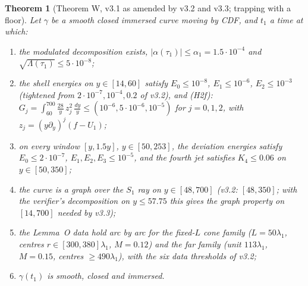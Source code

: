 \documentclass[11pt]{amsart}
\newtheorem{theorem}{Theorem}[section]
\theoremstyle{definition}
\theoremstyle{remark}
\newcommand{\Lam}{\Lambda}
\begin{document}
\begin{theorem}[Theorem W, v3.1 as amended by v3.2 and v3.3; trapping with a floor]\label{thm:W}
Let $\gamma$ be a smooth closed immersed curve moving by CDF, and $t_1$ a time at which:
\begin{enumerate}[label=\textup{(H\arabic*)},leftmargin=*,itemsep=1pt]
\item the modulated decomposition exists, $|\alpha(\tau_1)|\le\alpha_1=1.5\cdot10^{-4}$ and $\sqrt{\Lam(\tau_1)}\le5\cdot10^{-8}$;
\item the shell energies on $y\in[14,60]$ satisfy $E_0\le10^{-8}$, $E_1\le10^{-6}$, $E_2\le10^{-3}$ (tightened from $2\cdot10^{-7},10^{-4},0.2$ of v3.2), and \textup{(H2f)}: $G_j=\int_{60}^{700}\frac{28}y\,z_j^2\,\frac{dy}y\le(10^{-6},5\cdot10^{-6},10^{-5})$ for $j=0,1,2$, with $z_j=(y\partial_y)^j(f-U_1)$;
\item on every window $[y,1.5y]$, $y\in[50,253]$, the deviation energies satisfy $E_0\le2\cdot10^{-7}$, $E_1,E_2,E_3\le10^{-5}$, and the fourth jet satisfies $K_4\le0.06$ on $y\in[50,350]$;
\item the curve is a graph over the $S_1$ ray on $y\in[48,700]$ (v3.2: $[48,350]$; with the verifier's decomposition on $y\le57.75$ this gives the graph property on $[14,700]$ needed by v3.3);
\item the Lemma~O data hold arc by arc for the fixed-$L$ cone family ($L=50\lambda_1$, centres $r\in[300,380]\lambda_1$, $M=0.12$) and the far family (unit $113\lambda_1$, $M=0.15$, centres $\ge490\lambda_1$), with the six data thresholds of v3.2;
\item $\gamma(t_1)$ is smooth, closed and immersed.
\end{enumerate}

\end{theorem}
\end{document}
